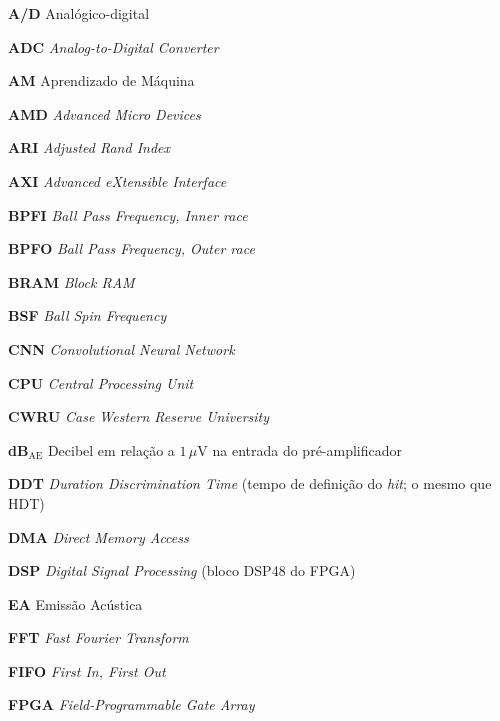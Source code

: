 \documentclass[
	12pt,				%
	oneside,
	a4paper,			%
	english,			%
	french,				%
	spanish,			%
	brazil				%
	]{abntex2}
\newcommand{\listofquadrosname}{Lista de quadros}
\begin{document}
\pagebreak
{}
\listoffigures*
\cleardoublepage


\listoftables*
\cleardoublepage

\begin{siglas}
	\item[\textbf{A/D}] Analógico-digital
	\item[\textbf{ADC}] \textit{Analog-to-Digital Converter}
	\item[\textbf{AM}] Aprendizado de Máquina
	\item[\textbf{AMD}] \textit{Advanced Micro Devices}
	\item[\textbf{ARI}] \textit{Adjusted Rand Index}
	\item[\textbf{AXI}] \textit{Advanced eXtensible Interface}
	\item[\textbf{BPFI}] \textit{Ball Pass Frequency, Inner race}
	\item[\textbf{BPFO}] \textit{Ball Pass Frequency, Outer race}
	\item[\textbf{BRAM}] \textit{Block RAM}
	\item[\textbf{BSF}] \textit{Ball Spin Frequency}
	\item[\textbf{CNN}] \textit{Convolutional Neural Network}
	\item[\textbf{CPU}] \textit{Central Processing Unit}
	\item[\textbf{CWRU}] \textit{Case Western Reserve University}
	\item[\textbf{dB\(_{\mathrm{AE}}\)}] Decibel em relação a \(1\,\mu\)V na entrada do pré-amplificador
	\item[\textbf{DDT}] \textit{Duration Discrimination Time} (tempo de definição do \textit{hit}; o mesmo que HDT)
	\item[\textbf{DMA}] \textit{Direct Memory Access}
	\item[\textbf{DSP}] \textit{Digital Signal Processing} (bloco DSP48 do FPGA)
	\item[\textbf{EA}] Emissão Acústica
	\item[\textbf{FFT}] \textit{Fast Fourier Transform}
	\item[\textbf{FIFO}] \textit{First In, First Out}
	\item[\textbf{FPGA}] \textit{Field-Programmable Gate Array}

\end{siglas}
\end{document}
